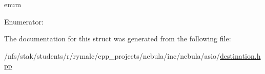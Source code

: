 enum \begin{Desc}
\item[Enumerator: ]\par
\begin{description}
\item[{\em 
\hypertarget{structFramework_1_1Communication_1_1Message_1_1DestType_ad65d11369deab210fbdbdd36cad21372a8ebb79626e8dcdf349c8f8d4d73b47b3}{
eCO\_\-AC\_\-AD\_\-ACTORBASE}
\label{structFramework_1_1Communication_1_1Message_1_1DestType_ad65d11369deab210fbdbdd36cad21372a8ebb79626e8dcdf349c8f8d4d73b47b3}
}]\end{description}
\end{Desc}



The documentation for this struct was generated from the following file:\begin{DoxyCompactItemize}
\item 
/nfs/stak/students/r/rymalc/cpp\_\-projects/nebula/inc/nebula/asio/\hyperlink{destination_8hpp}{destination.hpp}\end{DoxyCompactItemize}
